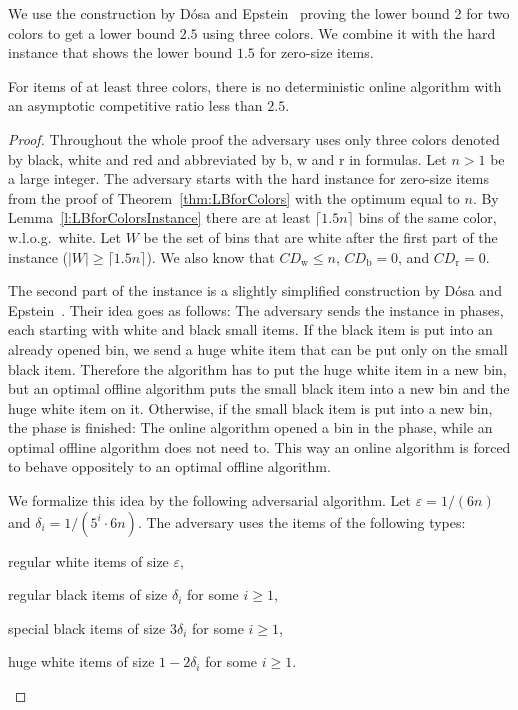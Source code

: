 \documentclass[11pt,a4paper]{article}
\def\vari#1{\mathit{#1}}
\begin{document}
We use the construction by D\'osa and Epstein~\cite{DosEps14} proving the lower bound 2 for two colors
to get a lower bound $2.5$ using three colors. We combine it with the hard instance that shows the lower bound
$1.5$ for zero-size items. 

\begin{theorem} \label{thm:LBforMoreColorsAndGeneralSizes}
For items of at least three colors, there is no deterministic online algorithm with an asymptotic
competitive ratio less than $2.5$. 
\end{theorem}

\begin{proof}
Throughout the whole proof the adversary uses only three colors denoted by black, white and red 
and abbreviated by b, w and r in formulas. 
Let $n > 1$ be a large integer.
The adversary starts with the hard instance for zero-size items from the proof of Theorem~\ref{thm:LBforColors}
with the optimum equal to $n$. By Lemma~\ref{l:LBforColorsInstance} there are at least $\lceil 1.5n \rceil$ bins 
of the same color, w.l.o.g.\ white.
Let $W$ be the set of bins that are white after the first part of the instance ($|W| \geq \lceil 1.5n \rceil$).
We also know that $\vari{CD}_{\mathrm{w}} \leq n$, $\vari{CD}_{\mathrm{b}} = 0$,
and $\vari{CD}_{\mathrm{r}} = 0$. 

The second part of the instance is a slightly simplified construction by D\'osa and Epstein~\cite{DosEps14}.
Their idea goes as follows: The adversary sends the instance in phases, 
each starting with white and black small items. If the black item is put into an already opened bin,
we send a huge white item that can be put only on the small black item.
Therefore the algorithm has to put the huge white item in a new bin, but an optimal offline
algorithm puts the small black item into a new bin and the huge white item on it.
Otherwise, if the small black item is put into a new bin, the phase is finished:
The online algorithm opened a bin in the phase, while an optimal offline algorithm does not need to.
This way an online algorithm is forced to behave oppositely to an optimal offline algorithm.

We formalize this idea by the following adversarial algorithm. Let $\varepsilon = 1/(6n)$ and
$\delta_i = 1/(5^i \cdot 6n)$. The adversary uses the items of the following types:
\begin{compactitem}
\item regular white items of size $\varepsilon$,
\item regular black items of size $\delta_i$ for some $i \geq 1$,
\item special black items of size $3\delta_i$ for some $i \geq 1$,
\item huge white items of size $1 - 2\delta_i$ for some $i \geq 1$.
\end{compactitem}


\end{proof}
\end{document}
